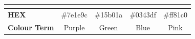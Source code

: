 \begin{table}[!ht]
\begin{tabular}{lcccc}
\multicolumn{1}{l|}{}                     & \multicolumn{1}{l|}{\cellcolor[HTML]{7E1E9C}} & \multicolumn{1}{l|}{\cellcolor[HTML]{15B01A}} & \multicolumn{1}{l|}{\cellcolor[HTML]{0343DF}} & \multicolumn{1}{l|}{\cellcolor[HTML]{FF81C0}} \\ \hline
\multicolumn{1}{|l|}{\textbf{HEX}}        & \multicolumn{1}{c|}{\#7e1e9c}                 & \multicolumn{1}{c|}{\#15b01a}                 & \multicolumn{1}{c|}{\#0343df}                 & \multicolumn{1}{c|}{\#ff81c0}                 \\ \hline
\multicolumn{1}{|l|}{\textbf{Colour Term}}  & \multicolumn{1}{c|}{Purple}                   & \multicolumn{1}{c|}{Green}                    & \multicolumn{1}{c|}{Blue}                     & \multicolumn{1}{c|}{Pink}                     \\ \hline
\end{tabular}
\label{table:colorshex}
\end{table}

